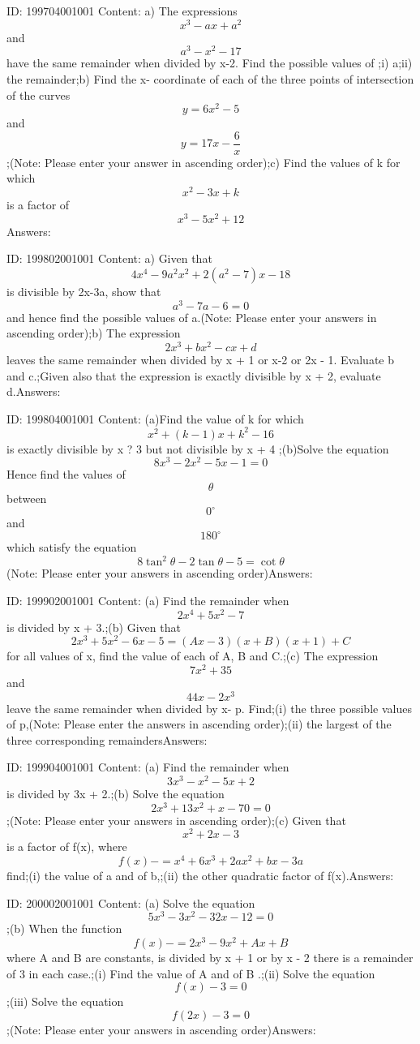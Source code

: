 \documentclass{article}
\begin{document}
ID: 199704001001
Content:
a) The expressions \[x^3-ax+a^2\] and \[a^3-x^2-17\] have the same remainder when divided by x-2. Find the possible values of ;i) a;ii) the remainder;b) Find the x- coordinate of each of the three points of intersection of the curves \[y=6x^2-5\] and \[y=17x-\frac{6}{x}\];(Note: Please enter your answer in ascending order);c) Find the values of k for which \[x^2-3x+k\] is a factor of \[x^3-5x^2+12\]Answers:

ID: 199802001001
Content:
a) Given that \[4x^4-9a^2x^2+2(a^2-7)x-18\] is divisible by 2x-3a, show that \[a^3-7a-6=0\] and hence find the possible values of a.(Note: Please enter your answers in ascending order);b) The expression \[2x^3+bx^2-cx+d\] leaves the same remainder when divided by x + 1 or x-2 or 2x - 1. Evaluate b and c.;Given also that the expression is exactly divisible by x + 2, evaluate d.Answers:

ID: 199804001001
Content:
(a)Find the value of k for which \[x^2+(k-1)x+k^2-16\] is exactly divisible by x ? 3 but not divisible by x + 4 ;(b)Solve the equation \[8x^3-2x^2-5x-1=0\]  Hence find the values of \[\theta\] between \[0^{\circ}\]  and \[180^{\circ}\]  which satisfy the equation \[8\tan^2\theta-2\tan\theta-5=\cot\theta\](Note: Please enter your answers in ascending order)Answers:

ID: 199902001001
Content:
(a) Find the remainder when \[2x^4+5x^2-7\] is divided by x + 3.;(b) Given that \[2x^3+5x^2-6x-5 =(Ax-3)(x+B)(x+1)+C\] for all values of x, find the value of each of A, B and C.;(c) The expression \[7x^2+35\] and \[44x-2x^3\] leave the same remainder when divided by x- p. Find;(i) the three possible values of p,(Note: Please enter the answers in ascending order);(ii) the largest of the three corresponding remaindersAnswers:

ID: 199904001001
Content:
(a) Find the remainder when \[3x^3-x^2-5x+2\] is divided by 3x + 2.;(b) Solve the equation \[2x^3+13x^2+x-70=0\];(Note: Please enter your answers in ascending order);(c) Given that \[x^2+2x-3\] is a factor of f(x), where \[f(x)-=x^4+6x^3+2ax^2+bx-3a\] find;(i)	the value of a and of b,;(ii)	the other quadratic factor of f(x).Answers:

ID: 200002001001
Content:
(a)	Solve the equation \[5x^3-3x^2-32x-12=0\];(b) When the function \[f(x)-=2x^3-9x^2+Ax+B\] where A and B are constants, is divided by x + 1 or by x - 2 there is a remainder of 3 in each case.;(i)	Find the value of A and of B .;(ii) Solve the equation \[f(x) - 3 = 0\] ;(iii) Solve the equation \[f(2x) - 3 = 0\];(Note: Please enter your answers in ascending order)Answers:
\end{document}
